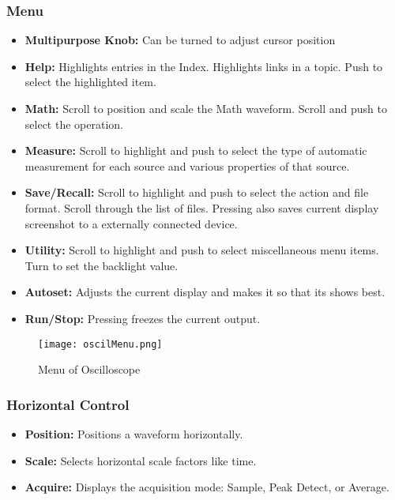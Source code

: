 \documentclass[12pt]{article}
\begin{document}
\subsubsection*{Menu}
\begin{itemize}
    \item[] \textbf{Multipurpose Knob:} Can be turned to adjust cursor position
    \item[] \textbf{Help:} Highlights entries in the Index. Highlights links in a topic. Push to select the highlighted item.
    \item[] \textbf{Math:} Scroll to position and scale the Math waveform. Scroll and push to select the operation.
    \item[] \textbf{Measure:} Scroll to highlight and push to select the type of automatic measurement for each source and various properties of that source.
    \item[] \textbf{Save/Recall:} Scroll to highlight and push to select the action and file format. Scroll through the list of files. Pressing also saves current display screenshot to a externally connected device.
    \item[] \textbf{Utility:} Scroll to highlight and push to select miscellaneous menu items. Turn to set the backlight value.
    \item[] \textbf{Autoset:} Adjusts the current display and makes it so that its shows best.
    \item[] \textbf{Run/Stop:} Pressing freezes the current output.
\end{itemize}

\begin{figure}[H]
    \centering
    \texttt{[image: oscilMenu.png]}
    \caption{Menu of Oscilloscope}
\end{figure}

\subsubsection*{Horizontal Control\cite{Theworki71:online}}
\begin{itemize}
    \item[] \textbf{Position:}  Positions a waveform horizontally.
    \item[] \textbf{Scale:} Selects horizontal scale factors like time.
    \item[] \textbf{Acquire:} Displays the acquisition mode: Sample, Peak Detect, or Average.
\end{itemize}
\end{document}
